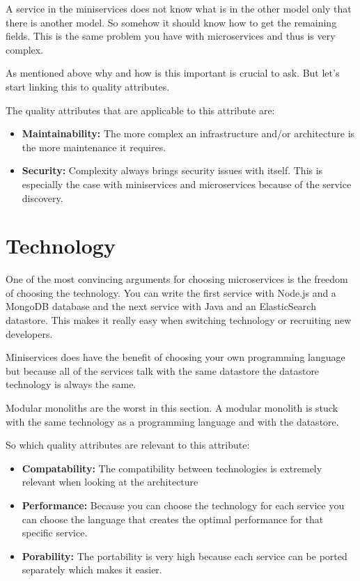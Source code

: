 A service in the miniservices does not know what is in the other model only that there is another model. So somehow it should know how to get the remaining fields. This is the same problem you have with microservices and thus is very complex.

As mentioned above why and how is this important is crucial to ask. But let’s start linking this to quality attributes.

The quality attributes that are applicable to this attribute are:
\begin{itemize}
        \item \textbf{Maintainability:} The more complex an infrastructure and/or architecture is the more maintenance it requires.
        \item \textbf{Security:} Complexity always brings security issues with itself. This is especially the case with miniservices and microservices because of the service discovery.
\end{itemize}

\section{Technology}
\label{sec:Technology}

One of the most convincing arguments for choosing microservices is the freedom of choosing the technology. You can write the first service with Node.js and a MongoDB database and the next service with Java and an ElasticSearch datastore. This makes it really easy when switching technology or recruiting new developers.

Miniservices does have the benefit of choosing your own programming language but because all of the services talk with the same datastore the datastore technology is always the same.

Modular monoliths are the worst in this section. A modular monolith is stuck with the same technology as a programming language and with the datastore.

So which quality attributes are relevant to this attribute:
\begin{itemize}
        \item \textbf{Compatability:} The compatibility between technologies is extremely relevant when looking at the architecture
        \item \textbf{Performance:} Because you can choose the technology for each service you can choose the language that creates the optimal performance for that specific service.
        \item \textbf{Porability:} The portability is very high because each service can be ported separately which makes it easier.
\end{itemize}

